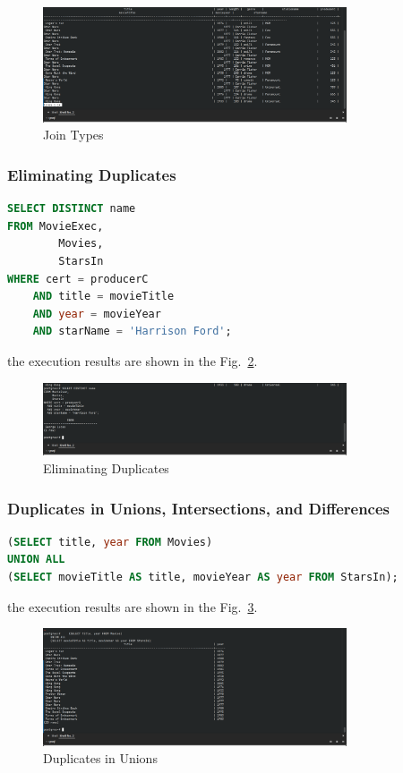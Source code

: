 \documentclass{cshwk}
\begin{document}
\begin{figure}[H]
    \centering
    \includegraphics[width=0.8\textwidth]{hw5-14.png}
    \caption{Join Types}
    \label{fig:join-types-4}
\end{figure}

\subsubsection{Eliminating Duplicates}

\begin{lstlisting}[language=sql]
SELECT DISTINCT name
FROM MovieExec,
        Movies,
        StarsIn
WHERE cert = producerC
    AND title = movieTitle
    AND year = movieYear
    AND starName = 'Harrison Ford';
\end{lstlisting}

the execution results are shown in the Fig.~\ref{fig:eliminating-duplicates}.

\begin{figure}[H]
    \centering
    \includegraphics[width=0.8\textwidth]{hw5-15.png}
    \caption{Eliminating Duplicates}
    \label{fig:eliminating-duplicates}
\end{figure}


\subsubsection{Duplicates in Unions, Intersections, and Differences}

\begin{lstlisting}[language=sql]
(SELECT title, year FROM Movies)
UNION ALL
(SELECT movieTitle AS title, movieYear AS year FROM StarsIn);
\end{lstlisting}

the execution results are shown in the Fig.~\ref{fig:duplicates-in-unions}.
\begin{figure}[H]
    \centering
    \includegraphics[width=0.8\textwidth]{hw5-16.png}
    \caption{Duplicates in Unions}
    \label{fig:duplicates-in-unions}
\end{figure}
\end{document}
